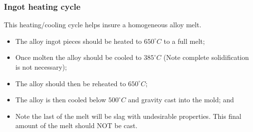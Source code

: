 \subsubsection{Ingot heating cycle}

This heating/cooling cycle helps insure a homogeneous alloy melt.
\begin{itemize}
\item The \MgZnCa alloy ingot pieces should be heated to $650^{\circ}C$ to a full melt;
\item Once molten the alloy should be cooled to $385^{\circ}C$ (Note complete solidification is not necessary);
\item The alloy should then be reheated to $650^{\circ}C$;
\item The alloy is then cooled below $500^{\circ}C$ and gravity cast into the mold; and
\item Note the last of the melt will be slag with undesirable properties. This final amount of the melt should NOT be cast.
\end{itemize}